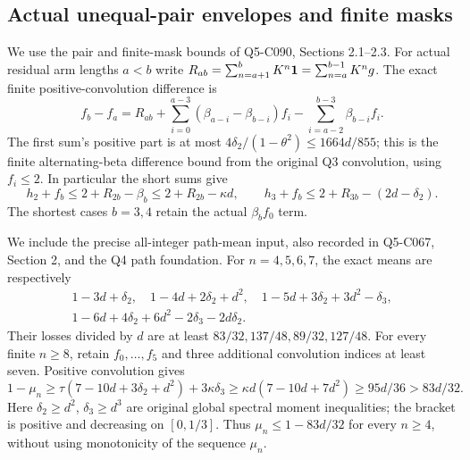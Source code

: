 \subsection{Actual unequal-pair envelopes and finite masks}\label{proof:Q5-C090}
We use the pair and finite-mask bounds of Q5-C090, Sections 2.1--2.3.
For actual residual arm lengths $a<b$ write
$R_{ab}=\sum_{n=a+1}^bK^n\mathbf1=\sum_{n=a}^{b-1}K^ng$.
The exact finite positive-convolution difference is
\begin{equation}\tag{L90.2.4}\label{eq:L90:difference}
f_b-f_a=R_{ab}
+\sum_{i=0}^{a-3}(\beta_{a-i}-\beta_{b-i})f_i
-\sum_{i=a-2}^{b-3}\beta_{b-i}f_i.
\end{equation}
The first sum's positive part is at most
$4\delta_2/(1-\theta^2)\le1664d/855$; this is the finite
alternating-beta difference bound from the original Q3 convolution,
using $f_i\le2$. In particular the short sums give
\[
h_2+f_b\le2+R_{2b}-\beta_b\le2+R_{2b}-\kappa d,
\qquad h_3+f_b\le2+R_{3b}-(2d-\delta_2).
\]
The shortest cases $b=3,4$ retain the actual $\beta_bf_0$ term.

We include the precise all-integer path-mean input, also recorded in
Q5-C067, Section 2, and the Q4 path foundation. For $n=4,5,6,7$,
the exact means are respectively
\[
\begin{gathered}
1-3d+\delta_2,\quad1-4d+2\delta_2+d^2,\quad
1-5d+3\delta_2+3d^2-\delta_3,\\
1-6d+4\delta_2+6d^2-2\delta_3-2d\delta_2.
\end{gathered}
\]
Their losses divided by $d$ are at least
$83/32,137/48,89/32,127/48$.
For every finite $n\ge8$, retain $f_0,\ldots,f_5$ and three
additional convolution indices at least seven. Positive convolution
gives
\[
1-\mu_n\ge\tau(7-10d+3\delta_2+d^2)+3\kappa\delta_3
\ge\kappa d(7-10d+7d^2)\ge95d/36>83d/32.
\]
Here $\delta_2\ge d^2$, $\delta_3\ge d^3$ are original global
spectral moment inequalities; the bracket is positive and decreasing
on $[0,1/3]$. Thus $\mu_n\le1-83d/32$ for every $n\ge4$,
without using monotonicity of the sequence $\mu_n$.

